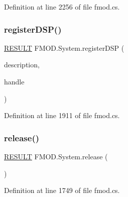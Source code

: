 Definition at line 2256 of file fmod.\+cs.

\mbox{\label{class_f_m_o_d_1_1_system_ae70aba013770ed657c4a7582c2664a3d}} 
\subsubsection{\texorpdfstring{register\+D\+S\+P()}{registerDSP()}}
{\footnotesize\ttfamily \hyperlink{namespace_f_m_o_d_a305d1176ef3f8c8815861a60407ac33d}{R\+E\+S\+U\+LT} F\+M\+O\+D.\+System.\+register\+D\+SP (\begin{DoxyParamCaption}\item[{ref \hyperlink{struct_f_m_o_d_1_1_d_s_p___d_e_s_c_r_i_p_t_i_o_n}{D\+S\+P\+\_\+\+D\+E\+S\+C\+R\+I\+P\+T\+I\+ON}}]{description,  }\item[{out uint}]{handle }\end{DoxyParamCaption})}



Definition at line 1911 of file fmod.\+cs.

\mbox{\label{class_f_m_o_d_1_1_system_a04ecea3393b620b5da5cf594e2056b1d}} 
\subsubsection{\texorpdfstring{release()}{release()}}
{\footnotesize\ttfamily \hyperlink{namespace_f_m_o_d_a305d1176ef3f8c8815861a60407ac33d}{R\+E\+S\+U\+LT} F\+M\+O\+D.\+System.\+release (\begin{DoxyParamCaption}{ }\end{DoxyParamCaption})}



Definition at line 1749 of file fmod.\+cs.

\mbox{\label{class_f_m_o_d_1_1_system_afc94ed4c6743f833f61ad913aea43a3a}} 
